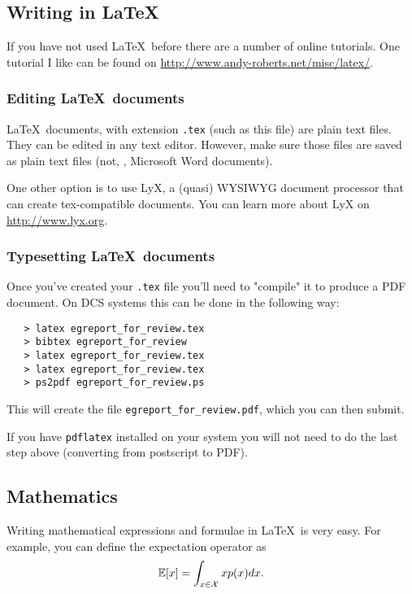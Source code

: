 \documentclass[10pt,twocolumn,letterpaper]{article}
\begin{document}
\subsection{Writing in \LaTeX}\label{sec:tutorial}

If you have not used \LaTeX\, before there are a number of online tutorials.  One tutorial I like can be found on \url{http://www.andy-roberts.net/misc/latex/}.

\subsubsection{Editing \LaTeX\, documents}

\LaTeX\, documents, with extension {\tt .tex} (such as this file) are plain text files.  They can be edited in any text editor.  However, make sure those files are saved as plain text files (not, \eg, Microsoft Word documents).

One other option is to use LyX, a (quasi) WYSIWYG document processor that can create tex-compatible documents.  You can learn more about LyX on \url{http://www.lyx.org}.

\subsubsection{Typesetting \LaTeX\, documents}

Once you've created your {\tt .tex} file you'll need to "compile" it to produce a PDF document.  On DCS systems this can be done in the following way:
{\small\begin{verbatim}
   > latex egreport_for_review.tex
   > bibtex egreport_for_review
   > latex egreport_for_review.tex
   > latex egreport_for_review.tex
   > ps2pdf egreport_for_review.ps
\end{verbatim}
}

This will create the file {\tt egreport\_for\_review.pdf}, which you can then submit.

If you have {\tt pdflatex} installed on your system you will not need to do the last step above (converting from postscript to PDF).


\subsection{Mathematics}

Writing mathematical expressions and formulae in \LaTeX\, is very easy.  For example, you can define the expectation operator as
\[
  \mathbb{E}[x] = \int_{x \in {\cal X}} x p(x) dx.
\]
\end{document}
